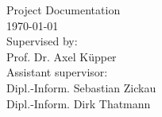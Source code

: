 \begin{titlepage}
\begin{center}
		Project Documentation\\
		\vspace{2.2cm}
		\today\\
		\vspace{2.0cm}
		\large
		Supervised by:\\
		Prof. Dr. Axel Küpper\\
		\vspace{1cm}
		Assistant supervisor:\\
		Dipl.-Inform. Sebastian Zickau \\
		Dipl.-Inform. Dirk Thatmann
		\end{center}
\end{titlepage}

